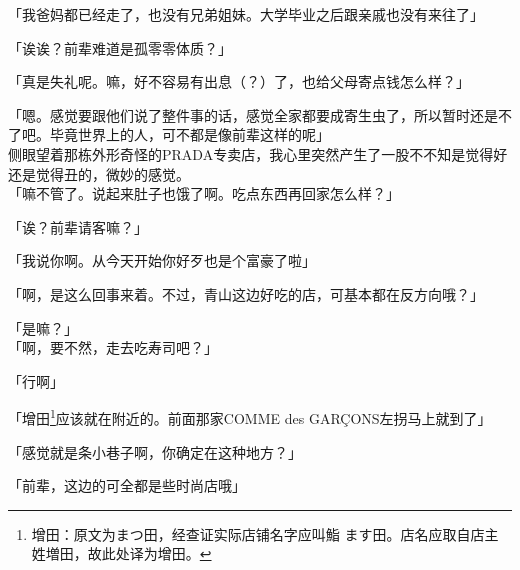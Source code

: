「我爸妈都已经走了，也没有兄弟姐妹。大学毕业之后跟亲戚也没有来往了」

「诶诶？前辈难道是孤零零体质？」

「真是失礼呢。嘛，好不容易有出息（？）了，也给父母寄点钱怎么样？」

「嗯。感觉要跟他们说了整件事的话，感觉全家都要成寄生虫了，所以暂时还是不了吧。毕竟世界上的人，可不都是像前辈这样的呢」\\

侧眼望着那栋外形奇怪的PRADA专卖店，我心里突然产生了一股不不知是觉得好还是觉得丑的，微妙的感觉。\\

「嘛不管了。说起来肚子也饿了啊。吃点东西再回家怎么样？」

「诶？前辈请客嘛？」

「我说你啊。从今天开始你好歹也是个富豪了啦」

「啊，是这么回事来着。不过，青山这边好吃的店，可基本都在反方向哦？」

「是嘛？」\\

「啊，要不然，走去吃寿司吧？」

「行啊」

「增田\footnote{增田：原文为まつ田，经查证实际店铺名字应叫鮨 ます田。店名应取自店主姓増田，故此处译为增田。}应该就在附近的。前面那家COMME des GARÇONS左拐马上就到了」

「感觉就是条小巷子啊，你确定在这种地方？」

「前辈，这边的可全都是些时尚店哦」

